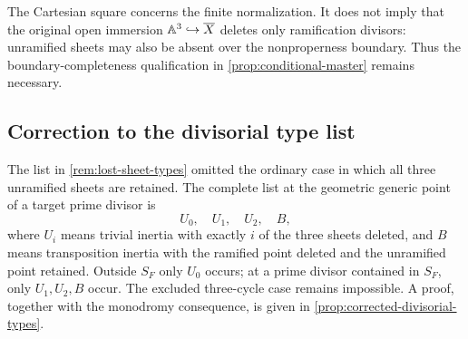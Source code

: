 \begin{remark}
The Cartesian square concerns the finite normalization.  It does not imply
that the original open immersion \(\mathbb A^3\hookrightarrow\overline X\) deletes
only ramification divisors: unramified sheets may also be absent over the
nonproperness boundary.  Thus the boundary-completeness qualification in
\cref{prop:conditional-master} remains necessary.
\end{remark}

\subsection{Correction to the divisorial type list}

The list in \cref{rem:lost-sheet-types} omitted the ordinary case in which
all three unramified sheets are retained.  The complete list at the geometric
generic point of a target prime divisor is
\[
U_0,\quad U_1,\quad U_2,\quad B,
\]
where \(U_i\) means trivial inertia with exactly \(i\) of the three sheets
deleted, and \(B\) means transposition inertia with the ramified point deleted
and the unramified point retained.  Outside \(S_F\) only \(U_0\) occurs; at a
prime divisor contained in \(S_F\), only \(U_1,U_2,B\) occur.  The excluded
three-cycle case remains impossible.  A proof, together with the monodromy
consequence, is given in \cref{prop:corrected-divisorial-types}.
